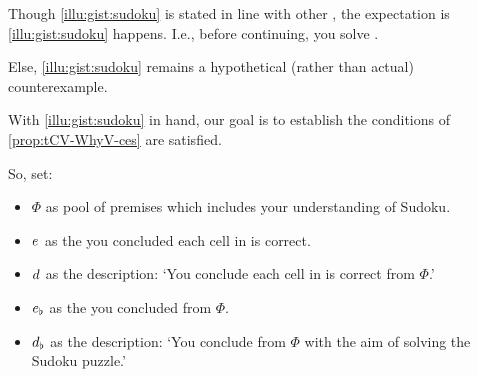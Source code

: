 \begin{note}
\begin{scenario}
\begin{figure}[h!]
\begin{subfigure}{.45\linewidth}
        \caption*{\sudokuPuzR{}}
      \end{subfigure}
    \end{figure}
    \vspace{-\baselineskip}
  \end{scenario}
\end{note}

\begin{note}
  Though \autoref{illu:gist:sudoku} is stated in line with other , the expectation is \autoref{illu:gist:sudoku} happens.
  I.e., before continuing, you solve \sudokuPuzL{}.

  Else, \autoref{illu:gist:sudoku} remains a hypothetical (rather than actual) counterexample.
\end{note}


\begin{note}
  With \autoref{illu:gist:sudoku} in hand, our goal is to establish the conditions of \autoref{prop:tCV-WhyV-ces} are satisfied.

  So, set:
  \begin{itemize}
  \item
    \(\Phi\) as pool of premises which includes your understanding of Sudoku.
  \item
    \(e\sb{}\) as the  you concluded each cell in \sudokuPuzL{} is correct.
  \item
    \(d\sb{}\) as the description: `You conclude each cell in \sudokuPuzL{} is correct from \(\Phi\).'
  \item
    \(e\sb{\flat}\) as the  you concluded \sudokuLPV{} from \(\Phi\).
  \item
    \(d\sb{\flat}\) as the description: `You conclude \sudokuLPV{} from \(\Phi\) with the aim of solving the Sudoku puzzle.'
  \end{itemize}
\end{note}

